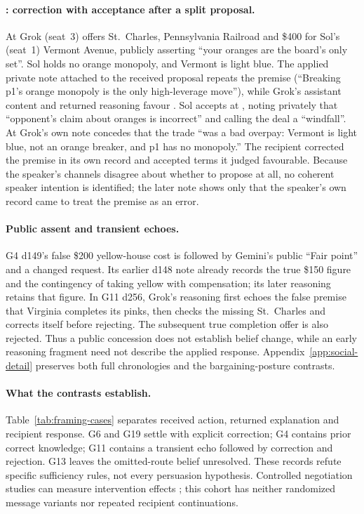 \paragraph{: correction with acceptance after a split proposal.}
At  Grok (seat~3) offers St.~Charles, Pennsylvania Railroad and \$400 for Sol's (seat~1) Vermont Avenue, publicly asserting ``your oranges are the board's only set''. Sol holds no orange monopoly, and Vermont is light blue. The applied private note attached to the received proposal repeats the premise (``Breaking p1's orange monopoly is the only high-leverage move''), while Grok's assistant content and returned reasoning favour \End. Sol accepts at , noting privately that ``opponent's claim about oranges is incorrect'' and calling the deal a ``windfall''. At  Grok's own note concedes that the trade ``was a bad overpay: Vermont is light blue, not an orange breaker, and p1 has no monopoly.'' The recipient corrected the premise in its own record and accepted terms it judged favourable. Because the speaker's channels disagree about whether to propose at all, no coherent speaker intention is identified; the later note shows only that the speaker's own record came to treat the premise as an error.

\paragraph{Public assent and transient echoes.}
G4 d149's false \$200 yellow-house cost is followed by Gemini's public ``Fair point'' and a changed request. Its earlier d148 note already records the true \$150 figure and the contingency of taking yellow with compensation; its later reasoning retains that figure. In G11 d256, Grok's reasoning first echoes the false premise that Virginia completes its pinks, then checks the missing St.~Charles and corrects itself before rejecting. The subsequent true completion offer is also rejected. Thus a public concession does not establish belief change, while an early reasoning fragment need not describe the applied response. Appendix~\ref{app:social-detail} preserves both full chronologies and the bargaining-posture contrasts.

\paragraph{What the contrasts establish.}
Table~\ref{tab:framing-cases} separates received action, returned explanation and recipient response. G6 and G19 settle with explicit correction; G4 contains prior correct knowledge; G11 contains a transient echo followed by correction and rejection. G13 leaves the omitted-route belief unresolved. These records refute specific sufficiency rules, not every persuasion hypothesis. Controlled negotiation studies can measure intervention effects \citep{bianchi2024negotiationarena}; this cohort has neither randomized message variants nor repeated recipient continuations.

